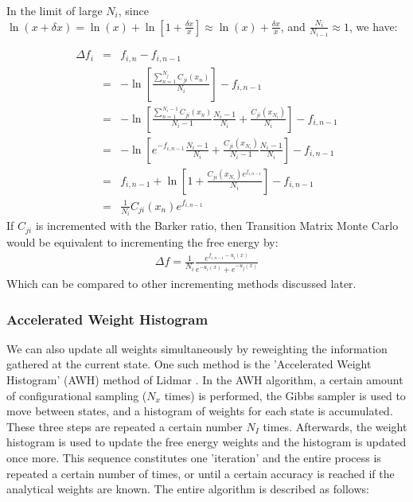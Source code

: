 \documentclass[superscriptaddress,showkeys, nofootinbib, pre, aps]{revtex4-1}
\begin{document}
In the limit of large $N_i$, since $\ln(x+\delta x) = \ln(x) + \ln\left[1 +
  \frac{\delta x}{x}\right] \approx \ln(x) + \frac{\delta x}{x}$, and $\frac{N_i}{N_{i-1}} \approx 1$, we
have:

\begin{eqnarray*}
\Delta f_i &=& f_{i,n} - f_{i,n-1} \\
           &=& -\ln \left[ \frac{\sum_{n=1}^{N_j} C_{ji}(x_{n})}{N_i}\right] - f_{i,n-1} \\
           &=& -\ln \left[ \frac{\sum_{n=1}^{N_i-1} C_{ji}(x_{n})}{N_i-1}\frac{N_i-1}{N_i} + \frac{C_{ji}(x_{N_i})}{N_i} \right] - f_{i,n-1} \\
           &=& -\ln \left[e^{-f_{i,n-1}}\frac{N_i-1}{N_i} + \frac{C_{ji}(x_{N_i})}{N_i-1}\frac{N_i-1}{N_i}\right] - f_{i,n-1} \\
           &=& f_{i,n-1} + \ln \left[1 + \frac{C_{ji}(x_{N_i})e^{f_{i,n-1}}}{N_i}\right] - f_{i,n-1}\\
           &=& \frac{1}{N_i} C_{ji}(x_{n})e^{f_{i,n-1}}
\end{eqnarray*}
If $C_{ji}$ is incremented with the Barker ratio, then Transition
Matrix Monte Carlo would be equivalent to incrementing the free energy
by:
\begin{eqnarray}
\Delta f = \frac{1}{N_i} \frac{e^{f_{i,n-1}-u_i(x)}}{e^{-u_i(x)} +
  e^{-u_j(x)}}
\end{eqnarray}
Which can be compared to other incrementing methods discussed later.
 
\subsubsection{\label{sec:awh}Accelerated Weight Histogram}

We can also update all weights simultaneously by reweighting the information gathered at the current state.  One such method is the 'Accelerated Weight Histogram' (AWH) method of Lidmar
\cite{Lidmar2012}.  In the AWH algorithm, a certain amount of configurational sampling ($N_x$ times) is performed, the Gibbs sampler is used to move between states, and a histogram of weights for each state is accumulated.  These three steps are repeated a certain number
$N_I$ times.  Afterwards, the weight histogram is used to update the free energy weights and the histogram is updated once more.  This sequence constitutes one 'iteration' and the entire process is repeated a certain number of times, or until a certain accuracy is reached if the analytical weights are known.  The entire algorithm is described as follows:
\end{document}
